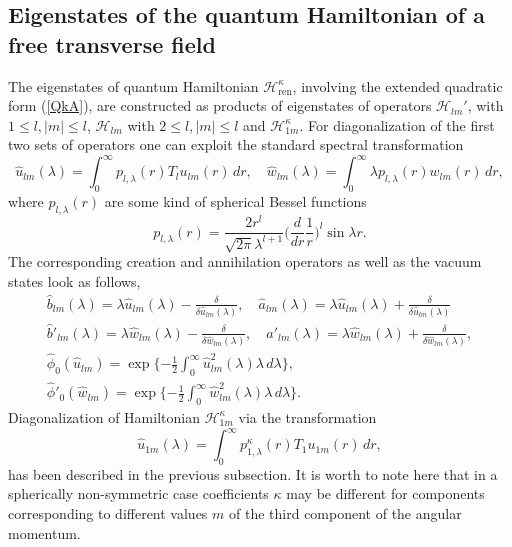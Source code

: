 \documentclass[12pt]{article}
\newcommand{\HH}{\mathscr{H}}
\begin{document}
\subsection{Eigenstates of the quantum Hamiltonian of a free transverse field}
	The eigenstates of quantum Hamiltonian
$ \HH_{\text{ren}}^{\kappa} $,
    involving the extended quadratic form
(\ref{QkA}),
	are constructed as products of eigenstates of operators
$ \HH_{lm}' $, with
$ 1\leq l, |m| \leq l $,
$ \HH_{lm} $ with
$ 2\leq l, |m| \leq l $ and
$ \HH_{1m}^{\kappa} $.
	For diagonalization of the first two sets of operators one can exploit
	the standard spectral transformation
\begin{equation*}
    \hat{u}_{lm}(\lambda)
	= \int_{0}^{\infty} p_{l,\lambda}(r) T_{l} u_{lm}(r)\,dr ,
    \quad \hat{w}_{lm}(\lambda)
	= \int_{0}^{\infty} \lambda p_{l,\lambda}(r) w_{lm}(r)\,dr ,
\end{equation*}
	where
$ p_{l,\lambda}(r) $
	are some kind of spherical Bessel functions
\begin{equation*}
    p_{l,\lambda}(r) = \frac{2r^{l}}{\sqrt{2\pi}\lambda^{l+1}}
	\bigl(\frac{d}{dr}\frac{1}{r}\bigr)^{l} \sin \lambda r .
\end{equation*}
	The corresponding creation and annihilation operators as well as the
	vacuum states look as follows,
\begin{gather*}
    \hat{b}_{lm}(\lambda) = \lambda \hat{u}_{lm}(\lambda)
	- \frac{\delta}{\delta \hat{u}_{lm}(\lambda)} ,\quad
    \hat{a}_{lm}(\lambda) = \lambda \hat{u}_{lm}(\lambda) 
	+ \frac{\delta}{\delta \hat{u}_{lm}(\lambda)} \\
    \hat{b}'_{lm}(\lambda) = \lambda \hat{w}_{lm}(\lambda)
	- \frac{\delta}{\delta \hat{w}_{lm}(\lambda)} ,\quad
    \hat{a}'_{lm}(\lambda) = \lambda \hat{w}_{lm}(\lambda) 
	+ \frac{\delta}{\delta \hat{w}_{lm}(\lambda)} ,\\
    \hat{\phi}_{0}(\hat{u}_{lm}) = \exp\{-\frac{1}{2}
	\int_{0}^{\infty} \hat{u}_{lm}^{2}(\lambda) \lambda \,d\lambda \} ,\\
    \hat{\phi}'_{0}(\hat{w}_{lm}) = \exp\{-\frac{1}{2}
	\int_{0}^{\infty} \hat{w}_{lm}^{2}(\lambda) \lambda \,d\lambda \} .
\end{gather*}
	Diagonalization of Hamiltonian
$ \HH_{1m}^{\kappa} $
	via the transformation
\begin{equation*}
    \hat{u}_{1m}(\lambda) = \int_{0}^{\infty} p_{1,\lambda}^{\kappa}(r)
	T_{1} u_{1m}(r)\,dr, 
\end{equation*}
	has been described in the previous subsection.
	It is worth to note here that in a spherically non-symmetric case
	coefficients
$ \kappa $
	may be different for components corresponding to different values
$ m $
	of the third component of the angular momentum.
\end{document}
